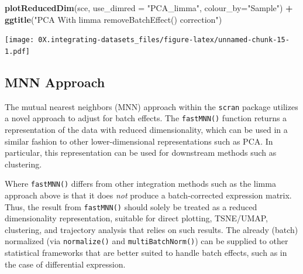 \documentclass[]{book}
\newenvironment{Shaded}{\begin{snugshade}}{\end{snugshade}}
\newcommand{\CommentTok}[1]{\textcolor[rgb]{0.56,0.35,0.01}{\textit{#1}}}
\newcommand{\DataTypeTok}[1]{\textcolor[rgb]{0.13,0.29,0.53}{#1}}
\newcommand{\DecValTok}[1]{\textcolor[rgb]{0.00,0.00,0.81}{#1}}
\newcommand{\KeywordTok}[1]{\textcolor[rgb]{0.13,0.29,0.53}{\textbf{#1}}}
\newcommand{\NormalTok}[1]{#1}
\newcommand{\OperatorTok}[1]{\textcolor[rgb]{0.81,0.36,0.00}{\textbf{#1}}}
\newcommand{\StringTok}[1]{\textcolor[rgb]{0.31,0.60,0.02}{#1}}
\begin{document}
\begin{Shaded}
\end{Shaded}

\begin{Shaded}
\begin{Highlighting}[]
\KeywordTok{plotReducedDim}\NormalTok{(sce, }\DataTypeTok{use_dimred =} \StringTok{"PCA_limma"}\NormalTok{,}
               \DataTypeTok{colour_by=}\StringTok{"Sample"}\NormalTok{) }\OperatorTok{+}\StringTok{ }
\StringTok{    }\KeywordTok{ggtitle}\NormalTok{(}\StringTok{"PCA With limma removeBatchEffect() correction"}\NormalTok{)}
\end{Highlighting}
\end{Shaded}

\texttt{[image: 0X.integrating-datasets\_files/figure-latex/unnamed-chunk-15-1.pdf]}

\hypertarget{mnn-approach}{%
\subsection{MNN Approach}\label{mnn-approach}}

The mutual nearest neighbors (MNN) approach within the \texttt{scran} package utilizes a novel approach to adjust for batch effects. The \texttt{fastMNN()} function returns a representation of the data with reduced dimensionality, which can be used in a similar fashion to other lower-dimensional representations such as PCA. In particular, this representation can be used for downstream methods such as clustering.

Where \texttt{fastMNN()} differs from other integration methods such as the limma approach above is that it does \emph{not} produce a batch-corrected expression matrix. Thus, the result from \texttt{fastMNN()} should solely be treated as a reduced dimensionality representation, suitable for direct plotting, TSNE/UMAP, clustering, and trajectory analysis that relies on such results. The already (batch) normalized (via \texttt{normalize()} and \texttt{multiBatchNorm()}) can be supplied to other statistical frameworks that are better suited to handle batch effects, such as in the case of differential expression.
\end{document}
